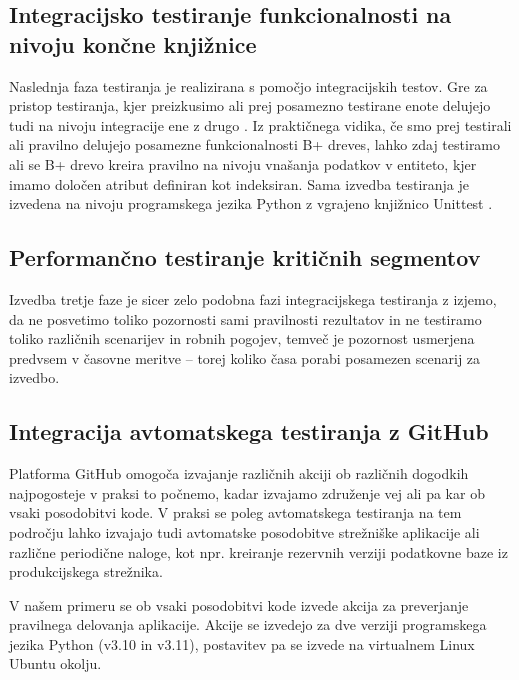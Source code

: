 \documentclass[a4paper,12pt,openright]{book}
\begin{document}
   \subsection{Integracijsko testiranje funkcionalnosti na nivoju končne knjižnice}

    Naslednja faza testiranja je realizirana s pomočjo integracijskih testov. Gre za pristop testiranja, kjer preizkusimo ali prej posamezno testirane enote delujejo tudi na nivoju integracije ene z drugo \cite{brar2015differentiating}. Iz praktičnega vidika, če smo prej testirali ali pravilno delujejo posamezne funkcionalnosti B+ dreves, lahko zdaj testiramo ali se B+ drevo kreira pravilno na nivoju vnašanja podatkov v entiteto, kjer imamo določen atribut definiran kot indeksiran. Sama izvedba testiranja je izvedena na nivoju programskega jezika Python z vgrajeno knjižnico Unittest \cite{PY_UNITTEST}.
   
   \subsection{Performančno testiranje kritičnih segmentov}

    Izvedba tretje faze je sicer zelo podobna fazi integracijskega testiranja z izjemo, da ne posvetimo toliko pozornosti sami pravilnosti rezultatov in ne testiramo toliko različnih scenarijev in robnih pogojev, temveč je pozornost usmerjena predvsem v časovne meritve – torej koliko časa porabi posamezen scenarij za izvedbo.
   
   \subsection{Integracija avtomatskega testiranja z GitHub}

   Platforma GitHub omogoča izvajanje različnih akciji ob različnih dogodkih najpogosteje v praksi to počnemo, kadar izvajamo združenje vej ali pa kar ob vsaki posodobitvi kode. V praksi se poleg avtomatskega testiranja na tem področju lahko izvajajo tudi avtomatske posodobitve strežniške aplikacije ali različne periodične naloge, kot npr. kreiranje rezervnih verziji podatkovne baze iz produkcijskega strežnika.

   V našem primeru se ob vsaki posodobitvi kode izvede akcija za preverjanje pravilnega delovanja aplikacije. Akcije se izvedejo za dve verziji programskega jezika Python (v3.10 in v3.11), postavitev pa se izvede na virtualnem Linux Ubuntu okolju.
\end{document}
